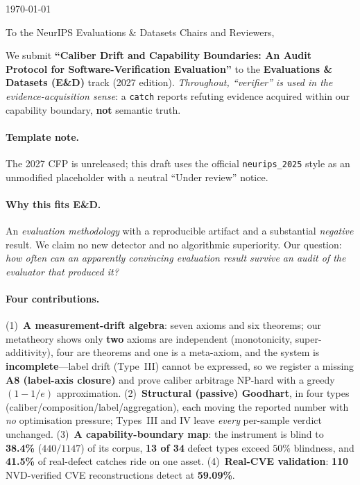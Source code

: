 \documentclass[11pt]{article}
\begin{document}
\begin{flushright}
  \today
\end{flushright}

\noindent
To the NeurIPS Evaluations \& Datasets Chairs and Reviewers,

\bigskip
\noindent
We submit \textbf{``Caliber Drift and Capability Boundaries: An Audit Protocol for
Software-Verification Evaluation''} to the \textbf{Evaluations \& Datasets (E\&D)} track
(2027 edition). \emph{Throughout, ``verifier'' is used in the
evidence-acquisition sense}: a \texttt{catch} reports refuting evidence acquired within
our capability boundary, \textbf{not} semantic truth.

\paragraph{Template note.}
The 2027 CFP is unreleased; this draft uses the official \texttt{neurips\_2025} style as
an unmodified placeholder with a neutral ``Under review'' notice.

\paragraph{Why this fits E\&D.}
An \emph{evaluation methodology} with a reproducible artifact and a substantial
\emph{negative} result. We claim no new detector and no algorithmic superiority. Our
question: \emph{how often can an apparently convincing evaluation result survive an audit
of the evaluator that produced it?}

\paragraph{Four contributions.}
(1)~\textbf{A measurement-drift algebra}: seven axioms and six theorems; our metatheory
shows only \textbf{two} axioms are independent (monotonicity, super-additivity), four are
theorems and one is a meta-axiom, and the system is \textbf{incomplete}---label drift
(Type~III) cannot be expressed, so we register a missing \textbf{A8 (label-axis closure)}
and prove caliber arbitrage NP-hard with a greedy $(1{-}1/e)$ approximation.
(2)~\textbf{Structural (passive) Goodhart}, in four types
(caliber/composition/label/aggregation), each moving the reported number with \emph{no}
optimisation pressure; Types~III and IV leave \emph{every} per-sample verdict unchanged.
(3)~\textbf{A capability-boundary map}: the instrument is blind to \textbf{38.4\%}
($440/1147$) of its corpus, \textbf{13 of 34} defect types exceed $50\%$ blindness, and
\textbf{41.5\%} of real-defect catches ride on one asset.
(4)~\textbf{Real-CVE validation}: \textbf{110} NVD-verified CVE reconstructions detect at
\textbf{59.09\%}.
\end{document}

